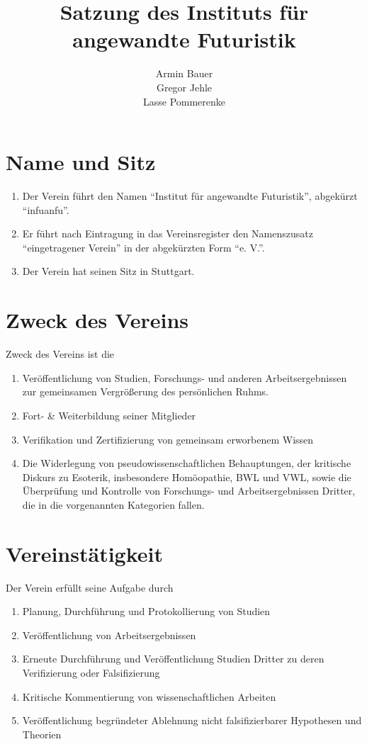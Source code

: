 \documentclass[a4paper]{article}
\author{Armin Bauer\\
Gregor Jehle\\
Lasse Pommerenke}
\date{}
\title{Satzung des Instituts für angewandte Futuristik}
\begin{document}
\maketitle


\section{Name und Sitz}\label{sec:name_und_sitz}

\begin{enumerate}
\item Der Verein führt den Namen "`Institut für angewandte Futuristik"', abgekürzt "`infuanfu"'.
\item Er führt nach Eintragung in das Vereinsregister den Namenszusatz "`eingetragener Verein"' in der abgekürzten Form "`e. V."'.
\item Der Verein hat seinen Sitz in Stuttgart.
\end{enumerate}


\section{Zweck des Vereins}\label{sec:zweck_des_vereins}

Zweck des Vereins ist die
\begin{enumerate}
\item Veröffentlichung von Studien, Forschungs- und anderen Arbeitsergebnissen zur gemeinsamen Vergrößerung des persönlichen Ruhms.
\item Fort- \& Weiterbildung seiner Mitglieder
\item Verifikation und Zertifizierung von gemeinsam erworbenem Wissen
\item Die Widerlegung von pseudowissenschaftlichen Behauptungen, der kritische Diskurs zu Esoterik, insbesondere Homöopathie, BWL und VWL, sowie die Überprüfung und Kontrolle von Forschungs- und Arbeitsergebnissen Dritter, die in die vorgenannten Kategorien fallen.
\end{enumerate}


\section{Vereinstätigkeit}\label{sec:vereinstaetigkeit}

Der Verein erfüllt seine Aufgabe durch
\begin{enumerate}
\item Planung, Durchführung und Protokollierung von Studien
\item Veröffentlichung von Arbeitsergebnissen 
\item Erneute Durchführung und Veröffentlichung Studien Dritter zu deren Verifizierung oder Falsifizierung
\item Kritische Kommentierung von wissenschaftlichen Arbeiten
\item Veröffentlichung begründeter Ablehnung nicht falsifizierbarer Hypothesen und Theorien
\end{enumerate}
\end{document}

